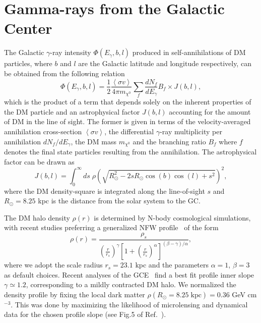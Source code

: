 \section{Gamma-rays from the Galactic Center }
\label{sec:gammarays_from_the_GC}
%
The Galactic $\gamma$-ray intensity $\Phi(E_{\gamma},b,l)$ produced in self-annihilations of DM particles, where $b$ and $l$ are the Galactic latitude and longitude respectively, can be obtained from the following relation~\cite{Baltz, Bergstrom,Rott}
\begin{equation}
\Phi(E_{\gamma},b,l)= \frac{1}{2}\frac{\left\langle\sigma v \right\rangle}{4\pi m_{\chi^0}}\sum_{f} \frac{dN_{f}}{dE_{\gamma}}B_f \times J(b,l),
\label{Phi}
\end{equation}
which is the product of a term that depends solely on the inherent properties of the DM particle and an astrophysical factor $J(b,l)$ accounting for the amount of DM in the line of sight.
 The former is given in terms of the velocity-averaged annihilation cross-section $\left\langle \sigma v \right\rangle$, the differential $\gamma$-ray multiplicity per annihilation $dN_{f}/dE_{\gamma}$, the DM mass $m_{\chi^0}$ and the branching ratio $B_f$ where $f$ denotes the final state particles resulting from the annihilation. 
The astrophysical factor can be drawn as ~\cite{Bergstrom, Rott}
\begin{equation}
J(b,l)=\int^{\infty}_0 ds\; \rho\left(\sqrt{R^2_{\odot}-2sR_{\odot}\cos(b)\cos(l)+s^2}\right)^2,
\label{J}
\end{equation}
where the DM density-square is integrated along the line-of-sight $s$ and $R_{\odot}=8.25$ kpc is the distance from the solar system to the GC.

The DM halo density $\rho(r)$ is determined by N-body cosmological simulations, with recent studies preferring a generalized NFW profile~\cite{navarrofrenkwhite1997} of the form
\begin{equation}
\rho(r)=\frac{\rho_s}{\left(\frac{r}{r_s}\right)^{\gamma}\left[1+\left(\frac{r}{r_s}\right)^{\alpha}\right]^{(\beta-\gamma)/\alpha}},
\label{nfw}
\end{equation}
where we adopt the scale radius $r_s=23.1$ kpc and the parameters $\alpha=1$, $\beta=3$ as default choices.
 Recent analyses of the GCE~\cite{GordonMacias2013,Daylan:2014,CaloreCholisWeniger2015} find a best fit profile inner slope $\gamma \simeq 1.2$, corresponding to a mildly contracted DM halo.
 We normalized the density profile by fixing the local dark matter $\rho(R_\odot=8.25\; \mbox{kpc})=0.36$ GeV cm$^{-3}$.
 This was done by maximizing the likelihood of microlensing and dynamical data for the chosen profile slope (see Fig.5 of Ref.~\cite{ioccopatobertone2011}). 


